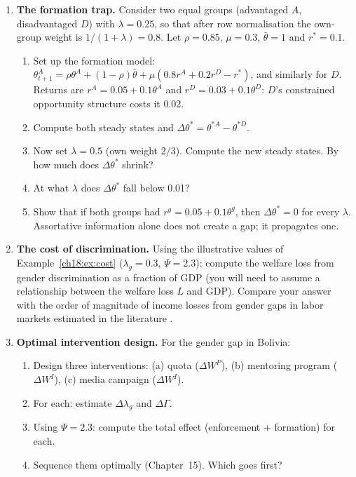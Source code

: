 \documentclass[../structural_economics_book.tex]{subfiles}
\begin{document}
\begin{enumerate}[label=\textbf{18.\arabic*}, leftmargin=3em]
\item \textbf{The formation trap.} Consider two equal groups (advantaged $A$, disadvantaged $D$) with $\lambda = 0.25$, so that after row normalisation the own-group weight is $1/(1+\lambda) = 0.8$. Let $\rho = 0.85$, $\mu = 0.3$, $\bar\theta = 1$ and $r^* = 0.1$.
\begin{enumerate}
\item Set up the formation model: $\theta^A_{t+1} = \rho\theta^A + (1-\rho)\bar{\theta} + \mu(0.8r^A + 0.2r^D - r^*)$, and similarly for $D$. Returns are $r^A = 0.05 + 0.1\theta^A$ and $r^D = 0.03 + 0.1\theta^D$: $D$'s constrained opportunity structure costs it 0.02.
\item Compute both steady states and $\Delta\theta^* = \theta^{*A} - \theta^{*D}$.
\item Now set $\lambda = 0.5$ (own weight $2/3$). Compute the new steady states. By how much does $\Delta\theta^*$ shrink?
\item At what $\lambda$ does $\Delta\theta^*$ fall below 0.01?
\item Show that if both groups had $r^g = 0.05 + 0.1\theta^g$, then $\Delta\theta^* = 0$ for every $\lambda$. Assortative information alone does not create a gap; it propagates one.
\end{enumerate}

\item \textbf{The cost of discrimination.} Using the illustrative values of Example~\ref{ch18:ex:cost} ($\lambda_g = 0.3$, $\Psi = 2.3$): compute the welfare loss from gender discrimination as a fraction of GDP (you will need to assume a relationship between the welfare loss $L$ and GDP). Compare your answer with the order of magnitude of income losses from gender gaps in labor markets estimated in the literature \citep[e.g.,][]{cuberes2016aggregate}.

\item \textbf{Optimal intervention design.} For the gender gap in Bolivia:
\begin{enumerate}
\item Design three interventions: (a) quota ($\Delta W^P$), (b) mentoring program ($\Delta W^I$), (c) media campaign ($\Delta W^I$).
\item For each: estimate $\Delta\lambda_g$ and $\Delta\Gamma$.
\item Using $\Psi = 2.3$: compute the total effect (enforcement + formation) for each.
\item Sequence them optimally (Chapter~15). Which goes first?
\end{enumerate}


\end{enumerate}
\end{document}
